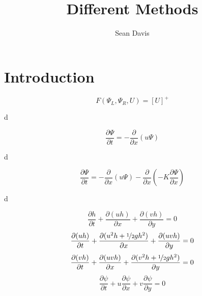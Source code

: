 \documentclass[11pt]{article}
\title{
Different Methods
}
\author{
   Sean Davis %
 }
\begin{document}
\maketitle


\section{Introduction}

\[
F\left(\Psi_L,\Psi_R,U\right) = [U]^+
\]

d

\[
\frac{\partial \Psi}{\partial t} = -\frac{\partial}{\partial x}(u\Psi)
\]

d

\[
\frac{\partial \Psi}{\partial t} = -\frac{\partial}{\partial x}(u\Psi)-\frac{\partial}{\partial x}\left(-K\frac{\partial \Psi}{\partial x}\right)
\]

d

\[
\frac{\partial h}{\partial t} + \frac{\partial(uh)}{\partial x} + \frac{\partial(vh)}{\partial y} = 0
\] \[
\frac{\partial (uh)}{\partial t} + \frac{\partial(u^2h+\nicefrac{1}{2} g h^2)}{\partial x} + \frac{\partial(uvh)}{\partial y} = 0
\] \[
\frac{\partial (vh)}{\partial t} + \frac{\partial(uvh)}{\partial x}+ \frac{\partial(v^2h+\nicefrac{1}{2} g h^2)}{\partial y}  = 0
\]
\[
\frac{\partial \psi}{\partial t} + u\frac{\partial \psi}{\partial x} + v\frac{\partial \psi}{\partial y} = 0
\]
\end{document}
